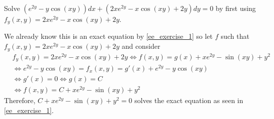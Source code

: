 \documentclass[notes]{subfiles}
\begin{document}
\begin{exercise}
    Solve $(e^{2y} - y\cos(xy))dx + (2xe^{2y} - x\cos(xy) + 2y)dy = 0$ by first using $f_y(x, y) = 2xe^{2y} - x\cos(xy) + 2y$.
\end{exercise}
\begin{solution}
    We already know this is an exact equation by \cref{ee_exercise_1} so let $f$ such that $f_y(x, y) = 2xe^{2y} - x\cos(xy) + 2y$ and consider
    \begin{align*}
        &f_y(x, y) = 2xe^{2y} - x\cos(xy) + 2y
        \iff f(x, y) = g(x) + xe^{2y} - \sin(xy) + y^2 \\
        &\iff e^{2y} - y\cos(xy) = f_x(x, y) = g'(x) + e^{2y} - y\cos(xy) \\
        &\iff g'(x) = 0
        \iff g(x) = C \\
        &\iff f(x, y) = C + xe^{2y} - \sin(xy) + y^2
    \end{align*}
    Therefore, $C + xe^{2y} - \sin(xy) + y^2 = 0$ solves the exact equation as seen in \cref{ee_exercise_1}.
\end{solution}
\end{document}
